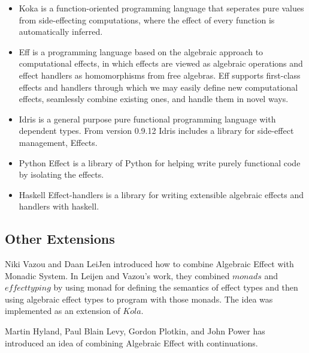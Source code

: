 \documentclass{article}
\begin{document}
\begin{itemize}
\item Koka is a function-oriented programming language that seperates pure values from side-effecting computations, where the effect of every function is automatically inferred.

\item Eff is a programming language based on the algebraic approach to computational effects, in which effects are viewed as algebraic operations and effect handlers as homomorphisms from free algebras.\cite{eff} Eff supports ﬁrst-class effects and handlers through which we may easily deﬁne new computational effects, seamlessly combine existing ones, and handle them in novel ways.

\item Idris is a general purpose pure functional programming language with dependent types. From version 0.9.12 Idris includes a library for side-effect management, Effects.


\item Python Effect is a library of Python for helping write purely functional code by isolating the effects\cite{python-effect}.

\item Haskell Effect-handlers is a library for writing extensible algebraic effects and handlers with haskell\cite{effect-handlers}.
\end{itemize}

\subsection{Other Extensions}

Niki Vazou and Daan LeiJen introduced how to combine Algebraic Effect with Monadic  System\cite{10.1007/978-3-319-28228-2_11}. In Leijen and Vazou's work, they combined $monads$ and $effect typing$ by using monad for defining the semantics of effect types and then using algebraic effect types to program with those monads. The idea was implemented as an extension of $Kola$.

Martin Hyland, Paul Blain Levy, Gordon Plotkin, and John Power has introduced an idea of combining Algebraic Effect with continuations\cite{HYLAND200720}.

{}
\end{document}
